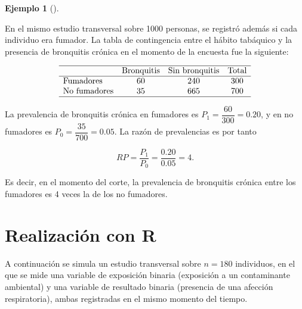 \documentclass[
  spanish,
  a4paper,
]{scrreport}
\theoremstyle{definition}
\newtheorem{example}{Ejemplo}[chapter]
\theoremstyle{definition}
\theoremstyle{remark}
\begin{document}
\begin{example}[]\protect\hypertarget{exm-transversales-razon-prevalencias}{}\label{exm-transversales-razon-prevalencias}

En el mismo estudio transversal sobre 1000 personas, se registró además
si cada individuo era fumador. La tabla de contingencia entre el hábito
tabáquico y la presencia de bronquitis crónica en el momento de la
encuesta fue la siguiente:

\[
\begin{array}{lccc}
\hline
 & \mbox{Bronquitis} & \mbox{Sin bronquitis} & \mbox{Total}\\
\hline
\mbox{Fumadores} & 60 & 240 & 300\\
\mbox{No fumadores} & 35 & 665 & 700\\
\hline
\end{array}
\]

La prevalencia de bronquitis crónica en fumadores es
\(P_1 = \dfrac{60}{300} = 0.20\), y en no fumadores es
\(P_0 = \dfrac{35}{700} = 0.05\). La razón de prevalencias es por tanto

\[RP = \frac{P_1}{P_0} = \frac{0.20}{0.05} = 4.\]

Es decir, en el momento del corte, la prevalencia de bronquitis crónica
entre los fumadores es 4 veces la de los no fumadores.

\end{example}

\section{Realización con R}\label{realizaciuxf3n-con-r-1}

A continuación se simula un estudio transversal sobre \(n=180\)
individuos, en el que se mide una variable de exposición binaria
(exposición a un contaminante ambiental) y una variable de resultado
binaria (presencia de una afección respiratoria), ambas registradas en
el mismo momento del tiempo.
\end{document}
